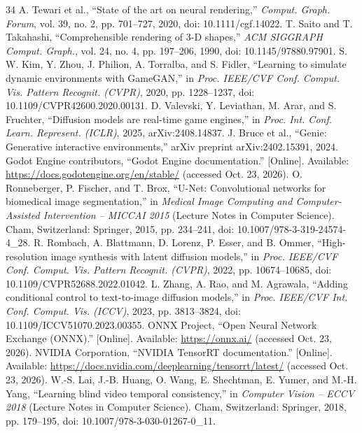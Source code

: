 \documentclass[conference]{IEEEtran}
\begin{document}
\begin{thebibliography}{34}
 A. Tewari et al., ``State of the art on neural rendering,'' \textit{Comput. Graph. Forum}, vol. 39, no. 2, pp. 701–727, 2020, doi: 10.1111/cgf.14022.
 T. Saito and T. Takahashi, ``Comprehensible rendering of 3-D shapes,'' \textit{ACM SIGGRAPH Comput. Graph.}, vol. 24, no. 4, pp. 197–206, 1990, doi: 10.1145/97880.97901.
 S. W. Kim, Y. Zhou, J. Philion, A. Torralba, and S. Fidler, ``Learning to simulate dynamic environments with GameGAN,'' in \textit{Proc. IEEE/CVF Conf. Comput. Vis. Pattern Recognit. (CVPR)}, 2020, pp. 1228–1237, doi: 10.1109/CVPR42600.2020.00131.
 D. Valevski, Y. Leviathan, M. Arar, and S. Fruchter, ``Diffusion models are real-time game engines,'' in \textit{Proc. Int. Conf. Learn. Represent. (ICLR)}, 2025, arXiv:2408.14837.
 J. Bruce et al., ``Genie: Generative interactive environments,'' arXiv preprint arXiv:2402.15391, 2024.
 Godot Engine contributors, ``Godot Engine documentation.'' [Online]. Available: \url{https://docs.godotengine.org/en/stable/} (accessed Oct. 23, 2026).
 O. Ronneberger, P. Fischer, and T. Brox, ``U-Net: Convolutional networks for biomedical image segmentation,'' in \textit{Medical Image Computing and Computer-Assisted Intervention – MICCAI 2015} (Lecture Notes in Computer Science). Cham, Switzerland: Springer, 2015, pp. 234–241, doi: 10.1007/978-3-319-24574-4\_28.
 R. Rombach, A. Blattmann, D. Lorenz, P. Esser, and B. Ommer, ``High-resolution image synthesis with latent diffusion models,'' in \textit{Proc. IEEE/CVF Conf. Comput. Vis. Pattern Recognit. (CVPR)}, 2022, pp. 10674–10685, doi: 10.1109/CVPR52688.2022.01042.
 L. Zhang, A. Rao, and M. Agrawala, ``Adding conditional control to text-to-image diffusion models,'' in \textit{Proc. IEEE/CVF Int. Conf. Comput. Vis. (ICCV)}, 2023, pp. 3813–3824, doi: 10.1109/ICCV51070.2023.00355.
 ONNX Project, ``Open Neural Network Exchange (ONNX).'' [Online]. Available: \url{https://onnx.ai/} (accessed Oct. 23, 2026).
 NVIDIA Corporation, ``NVIDIA TensorRT documentation.'' [Online]. Available: \url{https://docs.nvidia.com/deeplearning/tensorrt/latest/} (accessed Oct. 23, 2026).
 W.-S. Lai, J.-B. Huang, O. Wang, E. Shechtman, E. Yumer, and M.-H. Yang, ``Learning blind video temporal consistency,'' in \textit{Computer Vision – ECCV 2018} (Lecture Notes in Computer Science). Cham, Switzerland: Springer, 2018, pp. 179–195, doi: 10.1007/978-3-030-01267-0\_11.

\end{thebibliography}
\end{document}
